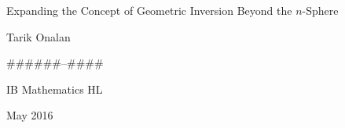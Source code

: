 \begin{titlepage}
    \centering
    {\LARGE Expanding the Concept of Geometric Inversion Beyond the $n$-Sphere\par}
    \vspace{2.0cm}
    {\Large Tarik Onalan \par}
    \vspace{1.0cm}
    {\Large \#\#\#\#\#\#--\#\#\#\# \par}
    \vspace{1.0cm}
    {\Large IB Mathematics HL \par}
    \vfill
    {\Large May 2016}
\end{titlepage}